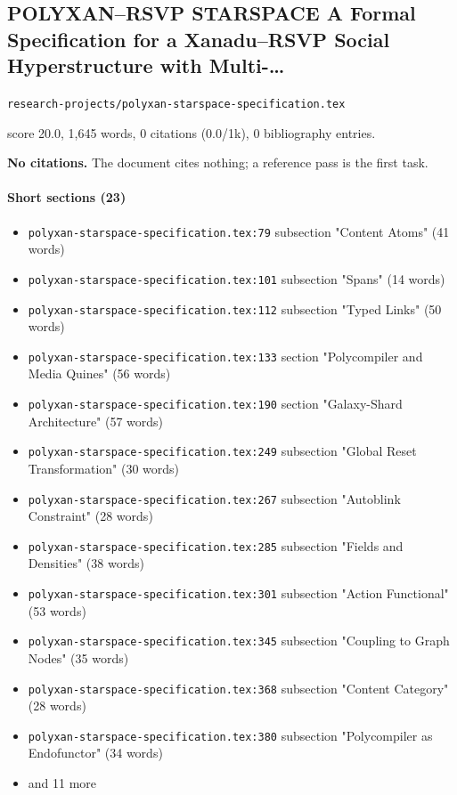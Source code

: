 \documentclass[11pt]{article}
\newcommand{\loc}[1]{{\small\color{muted}\texttt{#1}}}
\begin{document}
\subsection{POLYXAN--RSVP STARSPACE A Formal Specification for a Xanadu--RSVP Social Hyperstructure with Multi-\ldots{}}
\loc{research-projects/\allowbreak{}polyxan-starspace-specification.tex}\par
score 20.0, 1,645 words, 0 citations (0.0/1k), 0 bibliography entries.

\textbf{No citations.} The document cites nothing; a reference pass is the first task.

\paragraph{Short sections (23)}
\begin{itemize}
\item \loc{polyxan-starspace-specification.tex:79} subsection "Content Atoms" (41 words)
\item \loc{polyxan-starspace-specification.tex:101} subsection "Spans" (14 words)
\item \loc{polyxan-starspace-specification.tex:112} subsection "Typed Links" (50 words)
\item \loc{polyxan-starspace-specification.tex:133} section "Polycompiler and Media Quines" (56 words)
\item \loc{polyxan-starspace-specification.tex:190} section "Galaxy-Shard Architecture" (57 words)
\item \loc{polyxan-starspace-specification.tex:249} subsection "Global Reset Transformation" (30 words)
\item \loc{polyxan-starspace-specification.tex:267} subsection "Autoblink Constraint" (28 words)
\item \loc{polyxan-starspace-specification.tex:285} subsection "Fields and Densities" (38 words)
\item \loc{polyxan-starspace-specification.tex:301} subsection "Action Functional" (53 words)
\item \loc{polyxan-starspace-specification.tex:345} subsection "Coupling to Graph Nodes" (35 words)
\item \loc{polyxan-starspace-specification.tex:368} subsection "Content Category" (28 words)
\item \loc{polyxan-starspace-specification.tex:380} subsection "Polycompiler as Endofunctor" (34 words)
\item[] {\color{muted}\small and 11 more}
\end{itemize}
\end{document}
